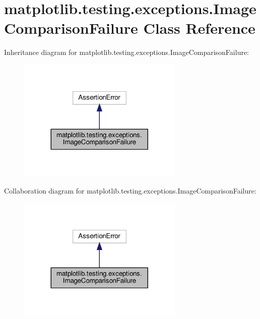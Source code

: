 \hypertarget{classmatplotlib_1_1testing_1_1exceptions_1_1ImageComparisonFailure}{}\section{matplotlib.\+testing.\+exceptions.\+Image\+Comparison\+Failure Class Reference}
\label{classmatplotlib_1_1testing_1_1exceptions_1_1ImageComparisonFailure}


Inheritance diagram for matplotlib.\+testing.\+exceptions.\+Image\+Comparison\+Failure\+:
\nopagebreak
\begin{figure}[H]
\begin{center}
\leavevmode
\includegraphics[width=224pt]{classmatplotlib_1_1testing_1_1exceptions_1_1ImageComparisonFailure__inherit__graph}
\end{center}
\end{figure}


Collaboration diagram for matplotlib.\+testing.\+exceptions.\+Image\+Comparison\+Failure\+:
\nopagebreak
\begin{figure}[H]
\begin{center}
\leavevmode
\includegraphics[width=224pt]{classmatplotlib_1_1testing_1_1exceptions_1_1ImageComparisonFailure__coll__graph}
\end{center}
\end{figure}


